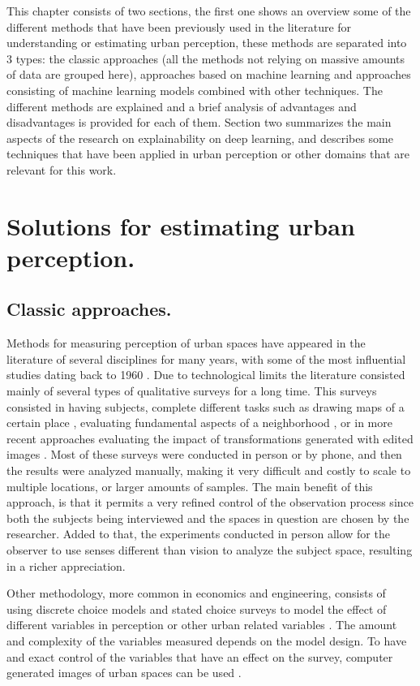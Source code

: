 This chapter consists of two sections, the first one shows an overview some of the
different methods that have been previously used in the literature
for understanding or estimating urban perception, these methods are separated
into 3 types: the classic approaches (all the methods not relying on
massive amounts of data are grouped here), approaches based on machine learning and
approaches consisting of machine learning models combined with other techniques.
The different methods are explained and a brief analysis of advantages and disadvantages
is provided for each of them. Section two summarizes the main aspects of the research
on explainability on deep learning, and describes some techniques that have been applied
in urban perception or other domains that are relevant for this work.


\section{Solutions for estimating urban perception.}

\subsection{Classic approaches.}
Methods for measuring perception of urban spaces have appeared in the literature of several
disciplines for many years,  with some of the most influential studies dating back to 1960
\cite{lynch}. Due to technological limits the literature consisted mainly of several types of
qualitative surveys for a long time. This surveys consisted in having subjects, complete
different tasks such as drawing maps of a certain place \cite{lynch}, evaluating fundamental
aspects of a neighborhood \cite{nasar_perception}, or in more recent approaches evaluating
the impact of transformations generated with edited images \cite{jiang_minimizing}. Most of
these surveys were conducted in person or by phone, and then the results were analyzed manually,
making it very difficult and costly to scale to multiple locations, or larger amounts of samples.
The main benefit of this approach, is that it permits a very refined control of the observation process
since both the subjects being interviewed and the spaces in question are chosen by the researcher.
Added to that, the experiments conducted in person allow for the observer to use senses different
than vision to analyze the subject space, resulting in a richer appreciation.

Other methodology, more common in economics and engineering, consists of using discrete choice models
and stated choice surveys to model the effect of different variables in perception or other urban
related variables  \cite{rose_sc, iglesias_perception, torres_housing}. The amount and complexity of the
variables measured depends on the model design. To have and exact control of the variables that
have an effect on the survey, computer generated images of urban spaces can be used
\cite{iglesias_perception,torres_housing}.

